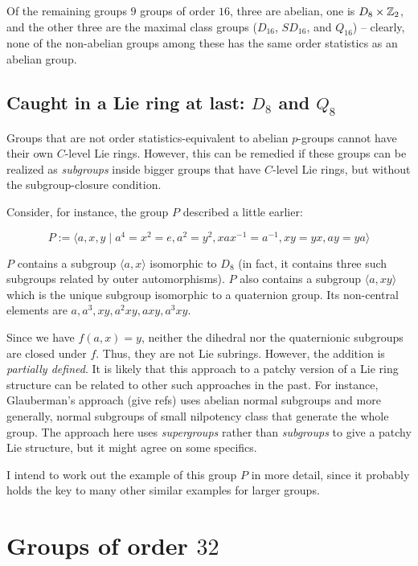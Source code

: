 \documentclass[10pt]{amsart}
\begin{document}
Of the remaining groups $9$ groups of order $16$, three are abelian,
one is $D_8 \times \mathbb{Z}_2$, and the other three are the maximal class
groups ($D_{16}$, $SD_{16}$, and $Q_{16}$) -- clearly, none of the
non-abelian groups among these has the same order statistics as an
abelian group.

\subsection{Caught in a Lie ring at last: $D_8$ and $Q_8$}

Groups that are not order statistics-equivalent to abelian $p$-groups
cannot have their own $C$-level Lie rings. However, this can be
remedied if these groups can be realized as {\em subgroups} inside
bigger groups that have $C$-level Lie rings, but without the
subgroup-closure condition.

Consider, for instance, the group $P$ described a little earlier:

$$P := \langle a,x,y \mid a^4 = x^2 = e, a^2 = y^2, xax^{-1} = a^{-1}, xy = yx, ay = ya\rangle$$

$P$ contains a subgroup $\langle a,x\rangle$ isomorphic to $D_8$ (in
fact, it contains three such subgroups related by outer
automorphisms). $P$ also contains a subgroup $\langle a, xy \rangle$
which is the unique subgroup isomorphic to a quaternion group. Its
non-central elements are $a,a^3, xy, a^2xy, axy, a^3xy$.

Since we have $f(a,x) = y$, neither the dihedral nor the quaternionic
subgroups are closed under $f$. Thus, they are not Lie
subrings. However, the addition is {\em partially defined}. It is
likely that this approach to a patchy version of a Lie ring structure
can be related to other such approaches in the past. For instance,
Glauberman's approach (give refs) uses abelian normal subgroups and
more generally, normal subgroups of small nilpotency class that
generate the whole group. The approach here uses {\em supergroups}
rather than {\em subgroups} to give a patchy Lie structure, but it
might agree on some specifics.

I intend to work out the example of this group $P$ in more detail,
since it probably holds the key to many other similar examples for
larger groups.

\section{Groups of order $32$}
\end{document}
